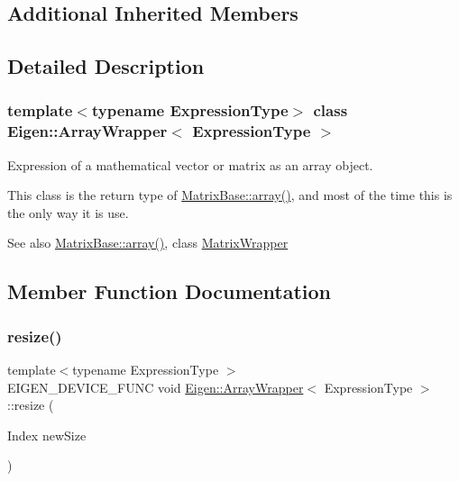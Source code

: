 \subsection*{Additional Inherited Members}


\subsection{Detailed Description}
\subsubsection*{template$<$typename Expression\+Type$>$\newline
class Eigen\+::\+Array\+Wrapper$<$ Expression\+Type $>$}

Expression of a mathematical vector or matrix as an array object. 

This class is the return type of \mbox{\hyperlink{class_eigen_1_1_matrix_base_a76a9dcb91ec82fbd6e74ca2ac2ae0e07}{Matrix\+Base\+::array()}}, and most of the time this is the only way it is use.

\begin{DoxySeeAlso}{See also}
\mbox{\hyperlink{class_eigen_1_1_matrix_base_a76a9dcb91ec82fbd6e74ca2ac2ae0e07}{Matrix\+Base\+::array()}}, class \mbox{\hyperlink{class_eigen_1_1_matrix_wrapper}{Matrix\+Wrapper}} 
\end{DoxySeeAlso}


\subsection{Member Function Documentation}
\mbox{\label{class_eigen_1_1_array_wrapper_a04bcb4140d2b2f9bf571efddac135a21}} 
\subsubsection{\texorpdfstring{resize()}{resize()}\hspace{0.1cm}{\footnotesize\ttfamily [1/2]}}
{\footnotesize\ttfamily template$<$typename Expression\+Type $>$ \\
E\+I\+G\+E\+N\+\_\+\+D\+E\+V\+I\+C\+E\+\_\+\+F\+U\+NC void \mbox{\hyperlink{class_eigen_1_1_array_wrapper}{Eigen\+::\+Array\+Wrapper}}$<$ Expression\+Type $>$\+::resize (\begin{DoxyParamCaption}\item[{Index}]{new\+Size }\end{DoxyParamCaption})\hspace{0.3cm}{\ttfamily [inline]}}

